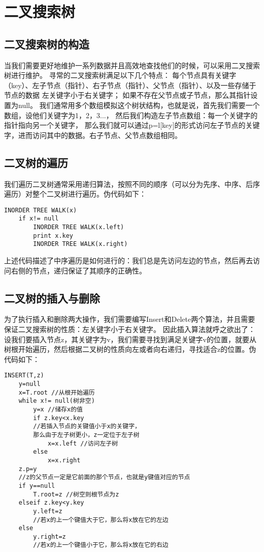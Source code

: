 \documentclass[12pt,a4paper,UTF16]{ctexbook}
\theoremstyle{plain}
\begin{document}
\section{二叉搜索树}
\subsection{二叉搜索树的构造}
当我们需要更好地维护一系列数据并且高效地查找他们的时候，可以采用二叉搜索树进行维护。
寻常的二叉搜索树满足以下几个特点：
每个节点具有关键字（key）、左子节点（指针）、右子节点（指针）、父节点（指针）、以及一些存储于节点的数据
左关键字小于右关键字；
如果不存在父节点或子节点，那么其指针设置为null。
我们通常用多个数组模拟这个树状结构，也就是说，首先我们需要一个数组，设他们关键字为1，2，3...，
然后我们构造左子节点数组：每一个关键字的指针指向另一个关键字，
那么我们就可以通过p=l[key]的形式访问左子节点的关键字，进而访问其中的数据。右子节点、父节点数组相同。
\subsection{二叉树的遍历}
我们遍历二叉树通常采用递归算法，按照不同的顺序（可以分为先序、中序、后序遍历）对整个二叉树进行遍历。伪代码如下：
\begin{lstlisting}[basicstyle=\ttfamily]
  INORDER TREE WALK(x)
    if x!= null
        INORDER TREE WALK(x.left)
        print x.key
        INORDER TREE WALK(x.right)
\end{lstlisting}
上述代码描述了中序遍历是如何进行的：我们总是先访问左边的节点，然后再去访问右侧的节点，递归保证了其顺序的正确性。
\subsection{二叉树的插入与删除}
为了执行插入和删除两大操作，我们需要编写Insert和Delete两个算法，并且需要保证二叉搜索树的性质：左关键字小于右关键字。
因此插入算法就呼之欲出了：设我们要插入节点z，其关键字为v，我们需要寻找到满足关键字v的位置，就要从树根开始遍历，然后根据二叉树的性质向左或者向右递归，寻找适合z的位置。伪代码如下：
\begin{lstlisting}[basicstyle=\ttfamily]
  INSERT(T,z)
    y=null
    x=T.root //从根开始遍历
    while x!= null(树非空)
        y=x //储存x的值
        if z.key<x.key 
        //若插入节点的关键值小于x的关键字，
        那么由于左子树更小，z一定位于左子树
            x=x.left //访问左子树
        else  
            x=x.right
    z.p=y 
    //z的父节点一定是它前面的那个节点，也就是y键值对应的节点
    if y==null
        T.root=z //树空则根节点为z
    elseif z.key<y.key
        y.left=z 
        //若x的上一个键值大于它，那么将x放在它的左边
    else 
        y.right=z 
        //若x的上一个键值小于它，那么将x放在它的右边
\end{lstlisting}
\end{document}
